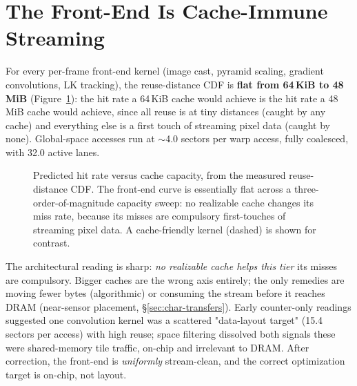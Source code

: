 \section{The Front-End Is Cache-Immune Streaming}
\label{sec:loc-frontend}

For every per-frame front-end kernel (image cast, pyramid scaling, gradient convolutions, LK tracking), the reuse-distance CDF is \textbf{flat from 64\,KiB to 48\,MiB} (Figure~\ref{fig:cdf}): the hit rate a 64\,KiB cache would achieve is the hit rate a 48\,MiB cache would achieve, since all reuse is at tiny distances (caught by any cache) and everything else is a first touch of streaming pixel data (caught by none). Global-space accesses run at $\sim$4.0 sectors per warp access, fully coalesced, with 32.0 active lanes.

\begin{figure}[t]
\centering
{}
\caption[Reuse-distance CDF: cache-immune streaming.]{Predicted hit rate versus
cache capacity, from the measured reuse-distance CDF. The front-end curve is
essentially flat across a three-order-of-magnitude capacity sweep: no realizable
cache changes its miss rate, because its misses are compulsory first-touches of
streaming pixel data. A cache-friendly kernel (dashed) is shown for contrast.}
\label{fig:cdf}
\end{figure}

The architectural reading is sharp: \emph{no realizable cache helps this tier} its misses are compulsory. Bigger caches are the wrong axis entirely; the only remedies are moving fewer bytes (algorithmic) or consuming the stream before it reaches DRAM (near-sensor placement, \S\ref{sec:char-transfers}). Early counter-only readings suggested one convolution kernel was a scattered "data-layout target" (15.4 sectors per access) with high reuse; space filtering dissolved both signals these were shared-memory tile traffic, on-chip and irrelevant to DRAM. After correction, the front-end is \emph{uniformly} stream-clean, and the correct optimization target is on-chip, not layout.

